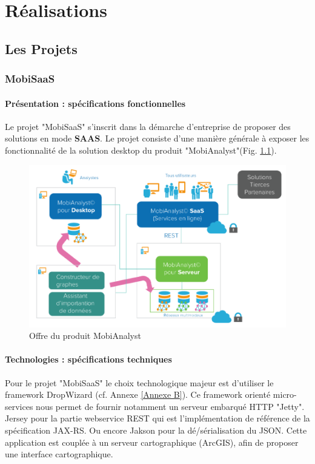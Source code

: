 \chapter{Réalisations}
\label{Developpement}


\section{Les Projets}

\subsection{MobiSaaS}

\subsubsection{Présentation : spécifications fonctionnelles}

Le projet "MobiSaaS" s'inscrit dans la démarche d'entreprise de proposer des solutions en mode \textbf{SAAS}. Le projet consiste d'une manière générale à exposer les fonctionnalité de la solution desktop du produit "MobiAnalyst"(Fig. \ref{OffreMobiAnalyst}).

\begin{figure}[!h]
\centering
\includegraphics[width=14cm]{images/offre_MobiAnalyst.png}
\caption{\label{OffreMobiAnalyst}Offre du produit MobiAnalyst}
\end{figure} 

\subsubsection{Technologies : spécifications techniques}

Pour le projet "MobiSaaS" le choix technologique majeur est d'utiliser le framework DropWizard (cf. Annexe \ref{Annexe B}). Ce framework orienté micro-services nous permet de fournir notamment un serveur embarqué HTTP "Jetty". Jersey pour la partie webservice REST qui est l'implémentation de référence de la spécification JAX-RS. Ou encore Jakson pour la dé/sérialisation du JSON. Cette application est couplée à un serveur cartographique (ArcGIS), afin de proposer une interface cartographique.\\

